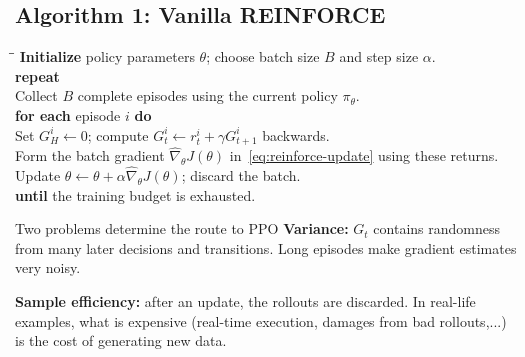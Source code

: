 \documentclass[11pt,a4paper]{article}
\newcommand{\nexttopic}{\clearpage}
\begin{document}
\subsection{Algorithm 1: Vanilla REINFORCE}
{\small
\begin{tabbing}
\hspace{1.3em}\=\hspace{1.3em}\=\kill
\textbf{Initialize} policy parameters $\theta$; choose batch size $B$ and step size $\alpha$.\\
\textbf{repeat}\\
\> Collect $B$ complete episodes using the current policy $\pi_\theta$.\\
\> \textbf{for each} episode $i$ \textbf{do}\\
\>\> Set $G_H^i\leftarrow0$; compute $G_t^i\leftarrow r_t^i+\gamma G_{t+1}^i$ backwards.\\
\> Form the batch gradient $\widehat \nabla_\theta J(\theta)$ in~\eqref{eq:reinforce-update} using these returns.\\
\> Update $\theta\leftarrow\theta+\alpha\widehat \nabla_\theta J(\theta)$; discard the batch.\\
\textbf{until} the training budget is exhausted.
\end{tabbing}}

\begin{idea}{Two problems determine the route to PPO}
\textbf{Variance:} $G_t$ contains randomness from many later decisions and
transitions. Long episodes make gradient estimates very noisy.\par
\textbf{Sample efficiency:} after an update, the rollouts are discarded. In real-life examples,
what is expensive (real-time execution, damages from bad rollouts,...) is the cost of generating new data.
\end{idea}

\nexttopic
\end{document}
